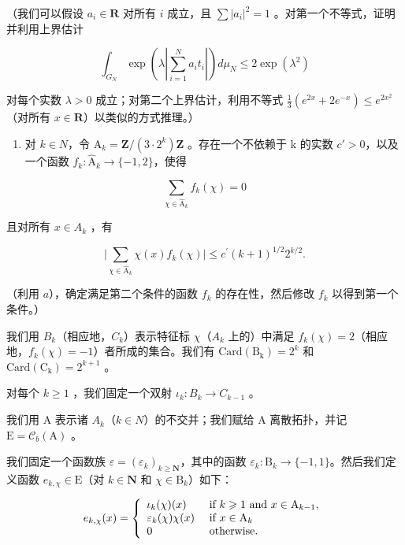 （我们可以假设 \(a_{i} \in \mathbf{R}\) 对所有 \(i\) 成立，且 \(\sum |a_{i}|^{2} = 1\) 。对第一个不等式，证明并利用上界估计

\[
\int_ {G _ {N}} \exp \left(\lambda \left| \sum_ {i = 1} ^ {N} a _ {i} t _ {i} \right|\right) d \mu_ {N} \leqslant 2 \exp (\lambda^ {2})
\]

对每个实数 \(\lambda > 0\) 成立；对第二个上界估计，利用不等式 \(\frac{1}{3}(e^{2x} + 2e^{-x}) \leqslant e^{2x^2}\)（对所有 \(x \in \mathbf{R}\)）以类似的方式推理。）

\begin{enumerate}
\def\labelenumi{\alph{enumi})}
\setcounter{enumi}{1}
\tightlist
\item
  对 \(k \in N\)，令 \(\mathrm{A}_{k} = \mathbf{Z}/(3 \cdot 2^{k})\mathbf{Z}\) 。存在一个不依赖于 k 的实数 \(c' > 0\)，以及一个函数 \(f_{k} \colon \widehat{\mathrm{A}}_{k} \to \{-1, 2\}\)，使得
\end{enumerate}

\[
\sum_ {\chi \in \widehat {\mathrm{A}} _ {k}} f _ {k} (\chi) = 0
\]

且对所有 \(x \in A_{k}\) ，有

\[
\Big | \sum_ {\chi \in \widehat {\mathrm{A}} _ {k}} \chi (x) f _ {k} (\chi) \Big | \leqslant c ^ {\prime} (k + 1) ^ {1 / 2} 2 ^ {k / 2}.
\]

（利用 \(a\)），确定满足第二个条件的函数 \(f_{k}\) 的存在性，然后修改 \(f_{k}\) 以得到第一个条件。）

我们用 \(B_{k}\)（相应地，\(C_{k}\)）表示特征标 \(\chi\)（\(A_{k}\) 上的）中满足 \(f_{k}(\chi)=2\)（相应地，\(f_{k}(\chi)=-1\)）者所成的集合。我们有 \(\mathrm{Card(B_{k})}=2^{k}\) 和 \(\mathrm{Card(C_{k})}=2^{k+1}\) 。

对每个 \(k \geqslant 1\) ，我们固定一个双射 \(\iota_k \colon B_k \to C_{k-1}\) 。

我们用 A 表示诸 \(A_{k}\)（\(k \in N\)）的不交并；我们赋给 A 离散拓扑，并记 \(\mathrm{E} = \mathcal{C}_{b}(\mathrm{A})\) 。

我们固定一个函数族 \(\varepsilon = (\varepsilon_k)_{k\geqslant \mathbf{N}}\)，其中的函数 \(\varepsilon_{k}\colon \mathrm{B}_{k}\to \{-1,1\}\)。然后我们定义函数 \(e_{k,\chi}\in \mathrm{E}\)（对 \(k\in \mathbf{N}\) 和 \(\chi \in \mathrm{B}_k\)）如下：

\[
e _ {k, \chi} (x) = \left\{ \begin{array}{l l} \iota_ {k} (\chi) (x) & \text { if } k \geqslant 1 \text {   and   } x \in \mathrm{A} _ {k - 1}, \\ \varepsilon_ {k} (\chi) \chi (x) & \text { if } x \in \mathrm{A} _ {k} \\ 0 & \text { otherwise. } \end{array} \right.
\]


